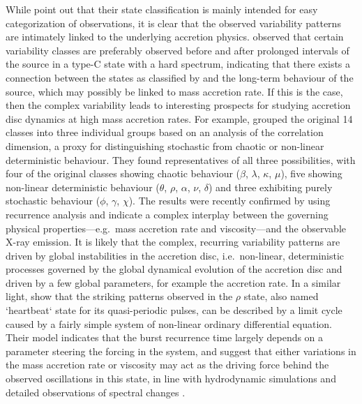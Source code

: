 \documentclass[12pt]{emulateapj}
\begin{document}
While \citet{belloni2000} point out that their state classification is mainly intended for easy categorization of observations, it is clear that the observed variability patterns are intimately linked to the underlying accretion physics. \citet{naik2002} observed that certain variability classes are preferably observed before and after prolonged intervals of the source in a type-C state with a hard spectrum, indicating that there exists a connection between the states as classified by \citet{belloni2000} and the long-term behaviour of the source, which may possibly be linked to mass accretion rate. If this is the case, then the complex variability leads to interesting prospects for studying accretion disc dynamics at high mass accretion rates. 
For example, \citet{misra2004, misra2006} grouped the original 14 classes into three individual groups based on an analysis of the correlation dimension, a proxy for distinguishing stochastic from chaotic or non-linear deterministic behaviour. They found representatives of all three possibilities, with four of the original classes showing chaotic behaviour ($\beta$, $\lambda$, $\kappa$, $\mu$), five showing non-linear deterministic behaviour ($\theta$, $\rho$, $\alpha$, $\nu$, $\delta$) and three exhibiting purely stochastic behaviour ($\phi$, $\gamma$, $\chi$). The results were recently confirmed by \citet{sukova2016} using recurrence analysis and indicate a complex interplay between the governing physical properties---e.g.\ mass accretion rate and viscosity---and the observable X-ray emission. 
It is likely that the complex, recurring variability patterns are driven by global instabilities in the accretion disc, i.e.\ non-linear, deterministic processes governed by the global dynamical evolution of the accretion disc and driven by a few global parameters, for example the accretion rate. In a similar light, \citet{massaro2014} show that the striking patterns observed in the $\rho$ state, also named `heartbeat` state for its quasi-periodic pulses, can be described by a limit cycle caused by a fairly simple system of non-linear ordinary differential equation. Their model indicates that the burst recurrence time largely depends on a parameter steering the forcing in the system, and suggest that either variations in the mass accretion rate or viscosity may act as the driving force behind the observed oscillations in this state, in line with hydrodynamic simulations \citep{nayakshin2000, merloni2006} and detailed observations of spectral changes \citep{neilsen2011, neilsen2012}.
\end{document}
